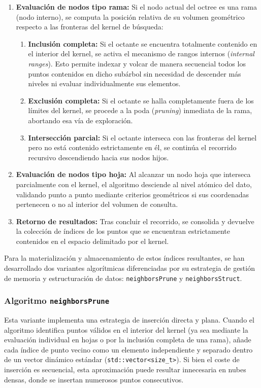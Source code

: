 \begin{enumerate}
    \item \textbf{Evaluación de nodos tipo rama:} Si el nodo actual del octree es una rama (nodo interno), se computa la posición relativa de su volumen geométrico respecto a las fronteras del kernel de búsqueda:
    \begin{enumerate}
        \item \textbf{Inclusión completa:} Si el octante se encuentra totalmente contenido en el interior del kernel, se activa el mecanismo de rangos internos (\textit{internal ranges}). Esto permite indexar y volcar de manera secuencial todos los puntos contenidos en dicho subárbol sin necesidad de descender más niveles ni evaluar individualmente sus elementos.
        \item \textbf{Exclusión completa:} Si el octante se halla completamente fuera de los límites del kernel, se procede a la poda (\textit{pruning}) inmediata de la rama, abortando esa vía de exploración.
        \item \textbf{Intersección parcial:} Si el octante interseca con las fronteras del kernel pero no está contenido estrictamente en él, se continúa el recorrido recursivo descendiendo hacia sus nodos hijos.
    \end{enumerate}
    \item \textbf{Evaluación de nodos tipo hoja:} Al alcanzar un nodo hoja que interseca parcialmente con el kernel, el algoritmo desciende al nivel atómico del dato, validando punto a punto mediante criterios geométricos si sus coordenadas pertenecen o no al interior del volumen de consulta.
    \item \textbf{Retorno de resultados:} Tras concluir el recorrido, se consolida y devuelve la colección de índices de los puntos que se encuentran estrictamente contenidos en el espacio delimitado por el kernel.
\end{enumerate}

Para la materialización y almacenamiento de estos índices resultantes, se han desarrollado dos variantes algorítmicas diferenciadas por su estrategia de gestión de memoria y estructuración de datos: \texttt{neighborsPrune} y \texttt{neighborsStruct}.

\subsubsection{Algoritmo \texttt{neighborsPrune}}
Esta variante implementa una estrategia de inserción directa y plana. Cuando el algoritmo identifica puntos válidos en el interior del kernel (ya sea mediante la evaluación individual en hojas o por la inclusión completa de una rama), añade cada índice de punto vecino como un elemento independiente y separado dentro de un vector dinámico estándar (\texttt{std::vector<size\_t>}). Si bien el coste de inserción es secuencial, esta aproximación puede resultar innecesaria en nubes densas, donde se insertan numerosos puntos consecutivos.

